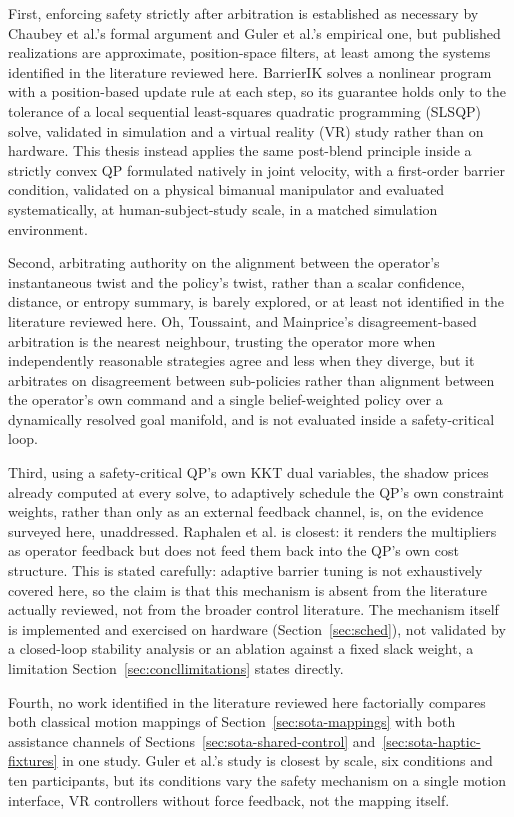 \documentclass[12pt,a4paper,twoside,openright]{report}
\begin{document}
First, enforcing safety strictly after arbitration is established as necessary by Chaubey et al.'s formal argument and Guler et al.'s empirical one, but published realizations are approximate, position-space filters, at least among the systems identified in the literature reviewed here. BarrierIK solves a nonlinear program with a position-based update rule at each step, so its guarantee holds only to the tolerance of a local sequential least-squares quadratic programming (SLSQP) solve, validated in simulation and a virtual reality (VR) study rather than on hardware. This thesis instead applies the same post-blend principle inside a strictly convex QP formulated natively in joint velocity, with a first-order barrier condition, validated on a physical bimanual manipulator and evaluated systematically, at human-subject-study scale, in a matched simulation environment.

Second, arbitrating authority on the alignment between the operator's instantaneous twist and the policy's twist, rather than a scalar confidence, distance, or entropy summary, is barely explored, or at least not identified in the literature reviewed here. Oh, Toussaint, and Mainprice's disagreement-based arbitration is the nearest neighbour, trusting the operator more when independently reasonable strategies agree and less when they diverge, but it arbitrates on disagreement between sub-policies rather than alignment between the operator's own command and a single belief-weighted policy over a dynamically resolved goal manifold, and is not evaluated inside a safety-critical loop.

Third, using a safety-critical QP's own KKT dual variables, the shadow prices already computed at every solve, to adaptively schedule the QP's own constraint weights, rather than only as an external feedback channel, is, on the evidence surveyed here, unaddressed. Raphalen et al. is closest: it renders the multipliers as operator feedback but does not feed them back into the QP's own cost structure. This is stated carefully: adaptive barrier tuning is not exhaustively covered here, so the claim is that this mechanism is absent from the literature actually reviewed, not from the broader control literature. The mechanism itself is implemented and exercised on hardware (Section~\ref{sec:sched}), not validated by a closed-loop stability analysis or an ablation against a fixed slack weight, a limitation Section~\ref{sec:concllimitations} states directly.

Fourth, no work identified in the literature reviewed here factorially compares both classical motion mappings of Section~\ref{sec:sota-mappings} with both assistance channels of Sections~\ref{sec:sota-shared-control} and~\ref{sec:sota-haptic-fixtures} in one study. Guler et al.'s study is closest by scale, six conditions and ten participants, but its conditions vary the safety mechanism on a single motion interface, VR controllers without force feedback, not the mapping itself.
\end{document}
